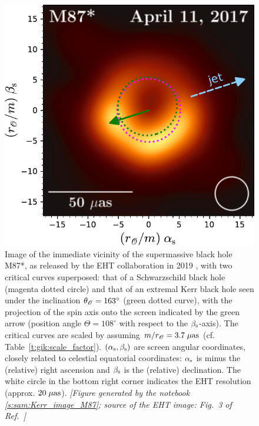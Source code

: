 \begin{figure}
\centerline{\includegraphics[height=0.35\textheight]{gik_M87_EHT_crit.pdf}}
\caption[]{\label{f:gik:M87_EHT_crit} \footnotesize
Image of the immediate vicinity of the supermassive black hole M87*,
as released by the EHT collaboration in 2019 \cite{EHT19a}, with
two critical curves superposed: that of a
Schwarzschild black hole (magenta dotted circle)
and that of an extremal Kerr black hole seen under the inclination $\theta_{\mathscr{O}} = 163^\circ$
(green dotted curve), with the projection of the spin axis onto the screen indicated by the
green arrow (position angle $\Theta=108^\circ$ with respect to the $\beta_{\rm s}$-axis).
The critical curves are scaled by assuming
$m/r_{\mathscr{O}} = 3.7 \; \mu{\rm as}$
(cf. Table~\ref{t:gik:scale_factor}).
$(\alpha_{\rm s}, \beta_{\rm s})$ are screen angular coordinates, closely
related to celestial equatorial coordinates:
$\alpha_{\rm s}$ is minus the (relative) right ascension
and $\beta_{\rm s}$ is the (relative) declination.
The white circle in the bottom right corner indicates the EHT resolution
(approx. $20\; \mu{\rm as}$).
\textsl{[Figure generated by the notebook \ref{s:sam:Kerr_image_M87}; source of the
EHT image: Fig.~3 of Ref.~\cite{EHT19a}]}
}
\end{figure}

